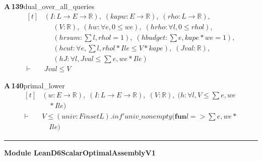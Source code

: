 \documentclass[conference]{IEEEtran}
\theoremstyle{definition}
\newcommand{\lean}[1]{\textsf{\footnotesize #1}}
\begin{document}
\noindent\textbf{A\,139}\quad\lean{dual\_over\_all\_queries}
{\footnotesize\[ \begin{aligned}[t]
&(\mathit{I} : \mathit{L} \to \mathit{E} \to \mathbb{R} ),\; (\mathit{kap} \mathit{w} : \mathit{E} \to \mathbb{R} ),\; (\mathit{rho} : \mathit{L} \to \mathbb{R} ),\\
&\quad \; (\mathit{V} : \mathbb{R} ),\; (\mathit{hw} : \forall \mathit{e}, 0 \leq \mathit{w} \mathit{e}),\; (\mathit{hrho} : \forall \mathit{l}, 0 \leq \mathit{rho} \mathit{l}),\\
&\quad \; (\mathit{hrsum} : \textstyle\sum \mathit{l}, \mathit{rho} \mathit{l} = 1),\; (\mathit{hbudget} : \textstyle\sum \mathit{e}, \mathit{kap} \mathit{e} * \mathit{w} \mathit{e} = 1),\\
&\quad \; (\mathit{hcut} : \forall \mathit{e}, \textstyle\sum \mathit{l}, \mathit{rho} \mathit{l} * \mathit{I} \mathit{l} \mathit{e} \leq \mathit{V} * \mathit{kap} \mathit{e}),\; (\mathit{Jval} : \mathbb{R} ),\\
&\quad \; (\mathit{hJ} : \forall \mathit{l}, \mathit{Jval} \leq \textstyle\sum \mathit{e}, \mathit{w} \mathit{e} * \mathit{I} \mathit{l} \mathit{e})\\
\vdash\;&\mathit{Jval} \leq \mathit{V}
\end{aligned} \]}

\noindent\textbf{A\,140}\quad\lean{primal\_lower}
{\footnotesize\[ \begin{aligned}[t]
&(\mathit{w} : \mathit{E} \to \mathbb{R} ),\; (\mathit{I} : \mathit{L} \to \mathit{E} \to \mathbb{R} ),\; (\mathit{V} : \mathbb{R} ),\; (\mathit{h} : \forall \mathit{l}, \mathit{V} \leq \textstyle\sum \mathit{e}, \mathit{w} \mathit{e}\\
&\quad * \mathit{I} \mathit{l} \mathit{e})\\
\vdash\;&\mathit{V} \leq (\mathit{univ} : \mathit{Finset} \mathit{L}).\mathit{inf'} \mathit{univ\_nonempty} (\mathbf{fun} \mathit{l} => \textstyle\sum \mathit{e}, \mathit{w} \mathit{e} *\\
&\quad \mathit{I} \mathit{l} \mathit{e})
\end{aligned} \]}

\vspace{4pt}\noindent\rule{\columnwidth}{0.4pt}\par\vspace{2pt}
\noindent\textbf{Module \lean{LeanD6ScalarOptimalAssemblyV1}}\par\vspace{3pt}
\end{document}
